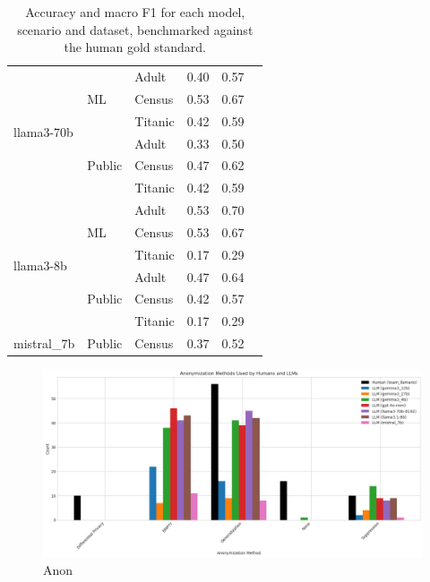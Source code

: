 \documentclass{article}
\begin{document}
\begin{table}[h]
\begin{tabular}{lllccl}
\midrule
\multirow{6}{*}{llama3-70b} & \multirow{3}{*}{ML} & Adult & 0.40 & 0.57 \\
                            &                     & Census & 0.53 & 0.67 \\
                            &                     & Titanic & 0.42 & 0.59 \\
                            & \multirow{3}{*}{Public} & Adult & 0.33 & 0.50 \\
                            &                          & Census & 0.47 & 0.62 \\
                            &                          & Titanic & 0.42 & 0.59 \\
\midrule
\multirow{6}{*}{llama3-8b} & \multirow{3}{*}{ML} & Adult & 0.53 & 0.70 \\
                           &                     & Census & 0.53 & 0.67 \\
                           &                     & Titanic & 0.17 & 0.29 \\
                           & \multirow{3}{*}{Public} & Adult & 0.47 & 0.64 \\
                           &                          & Census & 0.42 & 0.57 \\
                           &                          & Titanic & 0.17 & 0.29 \\
\midrule
mistral\_7b & Public & Census & 0.37 & 0.52 \\
\bottomrule
\end{tabular}
\caption{Accuracy and macro F1 for each model, scenario and dataset, benchmarked against the human gold standard.}
\label{tab:llm_eval_grouped}
\end{table}



\begin{figure}[h]
    \centering
    \includegraphics[width=1\linewidth]{images/plot_eval.png}
    \caption{Anon}
    \label{fig:anonymization-example}
\end{figure}
\end{document}
